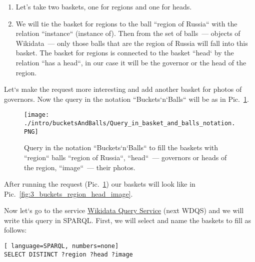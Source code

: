 \begin{enumerate}
    \item Let's take two baskets, one for regions and one for heads.
    \item We will tie the basket for regions to the ball ``region of Russia`` with the relation ``instance`` (instance of). Then from the set of balls~--- objects of Wikidata~--- only those balls that are the region of Russia will fall into this basket. The basket for regions is connected to the basket ``head` by the relation ``has a head``, in our case it will be the governor or the head of the region.
\end{enumerate}

Let`s make the request more interesting and add another basket for photos of governors. Now the query in the notation ``Buckets`n`Balls`` will be as in Pic.~\ref{fig:Query_in_basket_and_balls_notation}.

\begin{figure}[h!]
    \texttt{[image: ./intro/bucketsAndBalls/Query\_in\_basket\_and\_balls\_notation.PNG]}
    \caption{Query in the notation ``Buckets`n`Balls`` to fill the baskets with ``region`` balls ``region of Russia``, ``head``~--- governors or heads of the region, ``image``~--- their photos.}
	\label{fig:Query_in_basket_and_balls_notation}
\end{figure}

After running the request (Pic.~\ref{fig:Query_in_basket_and_balls_notation}) our baskets will look like in Pic.~\ref{fig:3_buckets_region_head_image}.

\begin{marginfigure}
	{
		\setlength{\fboxsep}{0pt}%
		\setlength{\fboxrule}{1pt}%
	}
    \caption{Baskets after running the request in Pic.~\ref{fig:Query_in_basket_and_balls_notation}. \textit{?region} these are the regions of Russia, \textit{?head} these are the heads, \textit{?image}~--- these are photos of heads.}
	\label{fig:3_buckets_region_head_image}
\end{marginfigure}

Now let`s go to the service \href{https://query.wikidata.org/}{Wikidata Query Service} (next WDQS) and we will write this query in SPARQL. First, we will select and name the baskets to fill as follows:

\begin{lstlisting}[ language=SPARQL, numbers=none]
SELECT DISTINCT ?region ?head ?image
\end{lstlisting}

